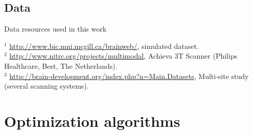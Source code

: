 \begin{landscape}
\section{Data}\label{a:data}

\begin{table*}[!h]
\caption[Datasets]{Data resources used in this work\label{table:data}}
\begin{minipage}{\linewidth}
\footnotesize
\setlength\LTleft{0pt}
\setlength\LTright{0pt}
\renewcommand\multirowsetup{\raggedright}

$^{1}$ \url{http://www.bic.mni.mcgill.ca/brainweb/}, simulated dataset. \\
$^{2}$ \url{http://www.nitrc.org/projects/multimodal}, Achieva 3T Scanner (Philips Healthcare, Best, The Netherlands). \\
$^{3}$ \url{http://brain-development.org/index.php?n=Main.Datasets}, Multi-site study (several scanning systems). \\
\end{minipage}
\end{table*}
\end{landscape}

\newpage
\section{Optimization algorithms}\label{a:algorithms}

